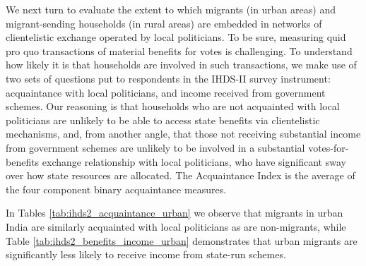 \documentclass[
  11.5pt,
]{article}
\begin{document}
We next turn to evaluate the extent to which migrants (in urban areas)
and migrant-sending households (in rural areas) are embedded in networks
of clientelistic exchange operated by local politicians. To be sure,
measuring quid pro quo transactions of material benefits for votes is
challenging. To understand how likely it is that households are involved
in such transactions, we make use of two sets of questions put to
respondents in the IHDS-II survey instrument: acquaintance with local
politicians, and income received from government schemes. Our reasoning
is that households who are not acquainted with local politicians are
unlikely to be able to access state benefits via clientelistic
mechanisms, and, from another angle, that those not receiving
substantial income from government schemes are unlikely to be involved
in a substantial votes-for-benefits exchange relationship with local
politicians, who have significant sway over how state resources are
allocated. The Acquaintance Index is the average of the four component
binary acquaintance measures.

In Tables \ref{tab:ihds2_acquaintance_urban} we observe that migrants in
urban India are similarly acquainted with local politicians as are
non-migrants, while Table \ref{tab:ihds2_benefits_income_urban}
demonstrates that urban migrants are significantly less likely to
receive income from state-run schemes.
\end{document}
